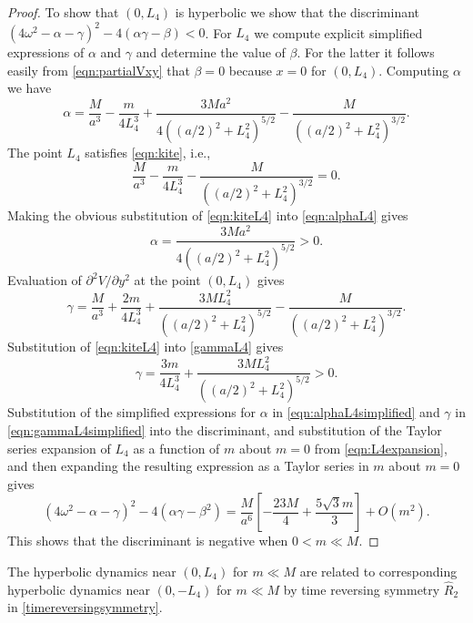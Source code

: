 \documentclass[12pt]{article}
\begin{document}
\begin{proof}
To show that $(0,L_4)$ is hyperbolic we show that the discriminant $(4\omega^2 - \alpha - \gamma)^2 - 4(\alpha\gamma-\beta)<0$. For $L_4$ we compute explicit simplified expressions of $\alpha$ and $\gamma$ and determine the value of $\beta$. For the latter it follows easily from \eqref{eqn:partialVxy} that $\beta = 0$ because $x=0$ for $(0,L_4)$. Computing $\alpha$ we have
\begin{equation}\label{eqn:alphaL4}
    \alpha
    =  \frac{M}{a^3} - \frac{m}{4 L_4^3} + \frac{3Ma^2}{4((a/2)^2 + L_4^2)^{5/2}} - \frac{M}{((a/2)^2 + L_4^2)^{3/2}}.
\end{equation}
The point $L_4$ satisfies \eqref{eqn:kite}, i.e.,
\begin{equation}\label{eqn:kiteL4}
\frac{M}{a^3} - \frac{m}{4 L_4^3}  - \frac{M}{((a/2)^2 + L_4^2)^{3/2}} = 0.
\end{equation}
Making the obvious substitution of \eqref{eqn:kiteL4} into \eqref{eqn:alphaL4} gives
\begin{equation}\label{eqn:alphaL4simplified}
\alpha =  \frac{3Ma^2}{4((a/2)^2 + L_4^2)^{5/2}} > 0.
\end{equation}
Evaluation of $\partial^2 V/\partial y^2$ at the point $(0,L_4)$ gives
\begin{equation}\label{gammaL4}
\gamma = \frac{M}{a^3} + \frac{2m}{4 L_4^3} + \frac{3M L_4^2}{((a/2)^2+ L_4^2)^{5/2}} - \frac{M}{((a/2)^2+L_4^2)^{3/2}}.
\end{equation}
Substitution of \eqref{eqn:kiteL4} into \eqref{gammaL4} gives
\begin{equation}\label{eqn:gammaL4simplified}
\gamma = \frac{3m}{4 L_4^3}+ \frac{3M L_4^2}{((a/2)^2+ L_4^2)^{5/2}} > 0.
\end{equation}
Substitution of the simplified expressions for $\alpha$ in \eqref{eqn:alphaL4simplified} and $\gamma$ in \eqref{eqn:gammaL4simplified} into the discriminant, and substitution of the Taylor series expansion of $L_4$ as a function of $m$ about $m=0$ from \eqref{eqn:L4expansion}, and then expanding the resulting expression as a Taylor series in $m$ about $m=0$ gives
\[ (4\omega^2 -\alpha -\gamma)^2 - 4(\alpha\gamma -\beta^2)
= \frac{M}{a^6}\left[ -\frac{23M}{4} + \frac{5\sqrt 3 m}{3}\right] + O(m^2).\]
This shows that the discriminant is negative when $0<m\ll M$.
\end{proof}

The hyperbolic dynamics near $(0,L_4)$ for $m \ll M$ are related to corresponding hyperbolic dynamics near $(0,-L_4)$ for $m \ll M$ by time reversing symmetry $\hat R_2$ in \eqref{timereversingsymmetry}. 
\end{document}
